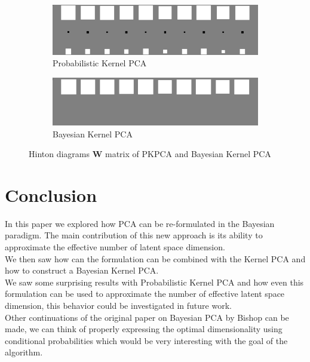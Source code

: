 \documentclass{article}
\begin{document}
\begin{figure}[ht]
    \centering
    \begin{subfigure}{.5\textwidth}
      \centering
      \includegraphics[width=.8\linewidth]{img/hinton_pkpca.png}
      \caption{Probabilistic Kernel PCA}
      \label{fig:pkpca_hinton}
    \end{subfigure}%
    \begin{subfigure}{.5\textwidth}
      \centering
      \includegraphics[width=.8\linewidth]{img/hinton_bkpca.png}
      \caption{Bayesian Kernel PCA}
      \label{fig:bayesk_hinton}
    \end{subfigure}
    \caption{Hinton diagrams $\mathbf{W}$ matrix of PKPCA and Bayesian Kernel PCA}
    \label{fig:hinton_kpca}
\end{figure}

\section{Conclusion}

In this paper we explored how PCA can be re-formulated in the Bayesian paradigm. The main contribution of this new approach is its ability to approximate the effective number of latent space dimension.\\
We then saw how can the formulation can be combined with the Kernel PCA and how to construct a Bayesian Kernel PCA.\\

We saw some surprising results with Probabilistic Kernel PCA and how even this formulation can be used to approximate the number of effective latent space dimension, this behavior could be investigated in future work.\\

Other continuations of the original paper on Bayesian PCA by Bishop can be made, we can think of properly expressing the optimal dimensionality using conditional probabilities which would be very interesting with the goal of the algorithm.


\end{document}
